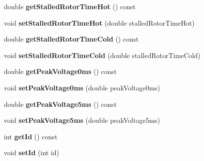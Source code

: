 \begin{DoxyCompactItemize}
\item 
\mbox{\label{class_motor_data_aede27e2ea96b57b0c11dd092801868c6}} 
double {\bfseries get\+Stalled\+Rotor\+Time\+Hot} () const
\item 
\mbox{\label{class_motor_data_a18cc65247e2e51cebe93faaceec44642}} 
void {\bfseries set\+Stalled\+Rotor\+Time\+Hot} (double stalled\+Rotor\+Time\+Hot)
\item 
\mbox{\label{class_motor_data_aa8ccd929fc9a25765440fb8b04e71a44}} 
double {\bfseries get\+Stalled\+Rotor\+Time\+Cold} () const
\item 
\mbox{\label{class_motor_data_ad52da7f0ac62233e71564023c22f6138}} 
void {\bfseries set\+Stalled\+Rotor\+Time\+Cold} (double stalled\+Rotor\+Time\+Cold)
\item 
\mbox{\label{class_motor_data_aef4147e64c402f7e89e295b050f302d3}} 
double {\bfseries get\+Peak\+Voltage0ms} () const
\item 
\mbox{\label{class_motor_data_ace2eb139ee2b7d070573ffd201853e41}} 
void {\bfseries set\+Peak\+Voltage0ms} (double peak\+Voltage0ms)
\item 
\mbox{\label{class_motor_data_a63cb35bd7064d68a989a84219b0f210a}} 
double {\bfseries get\+Peak\+Voltage5ms} () const
\item 
\mbox{\label{class_motor_data_a1556adb7bc4d3f92565e6fa3783e1d52}} 
void {\bfseries set\+Peak\+Voltage5ms} (double peak\+Voltage5ms)
\item 
\mbox{\label{class_motor_data_ac67a3f78e851968c9979e60cbf0f495b}} 
int {\bfseries get\+Id} () const
\item 
\mbox{\label{class_motor_data_ae26351f2cfd4e0acbd413b008ac2759f}} 
void {\bfseries set\+Id} (int id)
\item 
\mbox{\label{class_motor_data_aebca34509f0587da9fe3d488aba3a94e}} 

\end{DoxyCompactItemize}
